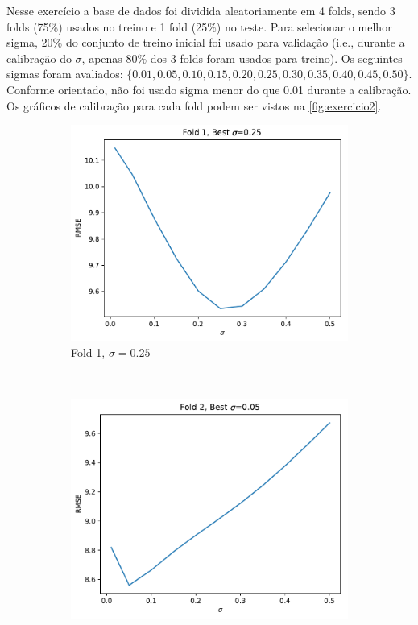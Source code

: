 \documentclass{article}
\begin{document}
Nesse exercício a base de dados foi dividida aleatoriamente em 4 folds, sendo 3 folds (75\%) usados no treino e 1 fold (25\%) no teste. Para selecionar o melhor sigma, 20\% do conjunto de treino inicial foi usado para validação (i.e., durante a calibração do $\sigma$, apenas 80\% dos 3 folds foram usados para treino). Os seguintes sigmas foram avaliados: $\{0.01, 0.05, 0.10, 0.15, 0.20, 0.25, 0.30, 0.35, 0.40, 0.45, 0.50\}$. Conforme orientado, não foi usado sigma menor do que 0.01 durante a calibração. Os gráficos de calibração para cada fold podem ser vistos na \autoref{fig:exercicio2}.

\begin{figure}[h!]
	\centering
	\begin{subfigure}[t]{0.24\textwidth}
		\centering
		\includegraphics[width=\linewidth]{exercicio2-fold-1.pdf}
		\caption{Fold 1, $\sigma=0.25$}
		\label{fig:exercicio2-fold1}
	\end{subfigure}%
	~ 
	\begin{subfigure}[t]{0.24\textwidth}
		\centering
		\includegraphics[width=\linewidth]{exercicio2-fold-2.pdf}

\end{subfigure}
\end{figure}
\end{document}
